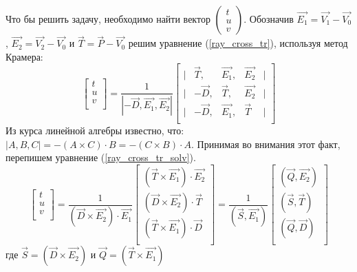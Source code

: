 \documentclass[12pt, a4paper]{article}
\def\VEC#1#2#3{\left( \begin{array}{c} #1 \\ #2 \\ #3 \end{array} \right) }
\begin{document}
Что бы решить задачу, необходимо найти вектор $\VEC{t}{u}{v}$. Обозначив $\vec{E_1} = \vec{V_1} - \vec{V_0}$, $\vec{E_2} = \vec{V_2} - \vec{V_0}$ и $\vec{T} = \vec{P} - \vec{V_0}$ решим уравнение (\ref{ray_cross_tr}), используя метод Крамера:
\begin{equation}
\label{ray_cross_tr_solv}
\left[  
\begin{array}{c} t \\ u \\ v \\ \end{array}
\right] = 
\frac{1}{| -\vec{D}, \vec{E_1}, \vec{E_2}|} 
\left[  
	\begin{array}{lcccl}
	|& \vec{T} , & \vec{E_1}, &\vec{E_2} & | \\
	|&-\vec{D} , & \vec{T}  , &\vec{E_2} & | \\
	|&-\vec{D} , & \vec{E_1}, &\vec{T}   & | \\
	\end{array}
\right] 
\end{equation}
Из курса линейной алгебры известно, что: $|A, B, C| = - (A \times C) \cdot B = - (C \times B) \cdot A$. Принимая во внимания этот факт, перепишем уравнение (\ref{ray_cross_tr_solv}).
\begin{equation}
\label{ray_cross_tr_solv2}
\left[  
\begin{array}{c} t \\ u \\ v \\ \end{array}
\right] = 
\frac{1}{(\vec{D} \times \vec{E_2})\cdot \vec{E_1}} 
\left[  
	\begin{array}{c}
	(\vec{T} \times \vec{E_1}) \cdot \vec{E_2} \\
	(\vec{D} \times \vec{E_2}) \cdot \vec{T} \\
	(\vec{T} \times \vec{E_1}) \cdot \vec{D} \\
	\end{array}
\right] = 
\frac{1}{(\vec{S}, \vec{E_1})} 
\left[  
	\begin{array}{c}
	(\vec{Q}, \vec{E_2}) \\
	(\vec{S}, \vec{T}) \\	
	(\vec{Q}, \vec{D}) \\	
	\end{array}
\right]
\end{equation}
где $\vec{S} = (\vec{D} \times \vec{E_2})$ и $\vec{Q} = (\vec{T} \times \vec{E_1})$
\end{document}
